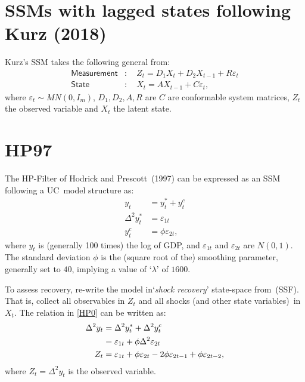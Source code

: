 \documentclass[a4paper,12pt]{article}
\newcommand{\bsq}{\begin{subequations}}\newcommand{\esq}{\end{subequations}}
\begin{document}
\section{SSMs with lagged states following Kurz (2018)\ }

Kurz's SSM takes the following general from:\bsq\label{SSM}%
\begin{align}
\mathsf{Measurement}& :\quad Z_{t}=D_{1}X_{t}+D_{2}X_{t-1}+R\varepsilon _{t}
\label{ssm1} \\
\mathsf{State}& :\quad X_{t}=AX_{t-1}+C\varepsilon _{t},  \label{ssm2}
\end{align}%
\esq where $\varepsilon _{t}\sim MN(0,I_{m})$, $D_{1},D_{2},A,R$ are $C$ are
conformable system matrices, $Z_{t}$ the observed variable and $X_{t}$ the
latent state.

\section{HP97}

The HP-Filter of Hodrick and Prescott\ (1997) can be expressed as an SSM
following a UC\ model structure as:\bsq\label{HP0}%
\begin{align}
y_{t}& =y_{t}^{\ast }+y_{t}^{c}  \label{HP0a} \\
\Delta ^{2}y_{t}^{\ast }& =\varepsilon _{1t}  \label{HP0b} \\
y_{t}^{c}& =\phi \varepsilon _{2t},  \label{HP0c}
\end{align}%
\esq where $y_{t}$ is (generally 100 times) the log of GDP, and $\varepsilon
_{1t}$ and $\varepsilon _{2t}$ are $N(0,1)$. The standard deviation $\phi $
is the (square root of the) smoothing parameter, generally set to $40$,
implying a value of `$\lambda $' of $1600$.

To assess recovery, re-write the model in`\emph{shock recovery}' state-space
from\ (SSF). That is, collect all observables in $Z_{t}$ and all shocks (and
other state variables)\ in $X_{t}$. The relation in \ref{HP0} can be written
as:%
\begin{align}
\Delta ^{2}y_{t}& =\Delta ^{2}y_{t}^{\ast }+\Delta ^{2}y_{t}^{c}  \notag \\
& =\varepsilon _{1t}+\phi \Delta ^{2}\varepsilon _{2t}  \notag \\
Z_{t}& =\varepsilon _{1t}+\phi \varepsilon _{2t}-2\phi \varepsilon
_{2t-1}+\phi \varepsilon _{2t-2},  \label{Z}
\end{align}%
where $Z_{t}=\Delta ^{2}y_{t}$ is the observed variable.
\end{document}
